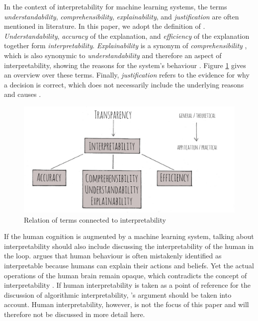 In the context of interpretability for machine learning systems, the terms \textit{understandability}, \textit{comprehensibility}, \textit{explainability}, and \textit{justification} are often mentioned in literature. In this paper, we adopt the definition of \cite{ruping2006learning}. \textit{Understandability}, \textit{accuracy} of the explanation, and \textit{efficiency} of the explanation together form \textit{interpretability}. \textit{Explainability} is a synonym of \textit{comprehensibility} \cite{weihs2003combining}, which is also synonymic to \textit{understandability} \cite{bibal2016interpretability} and therefore an aspect of interpretability, showing the reasons for the system's behaviour \cite{gilpin2018explaining}. Figure \ref{fig:definitions} gives an overview over these terms. Finally, \textit{justification} refers to the evidence for why a decision is correct, which does not necessarily include the underlying reasons and causes \cite{biran2017explanation}.\newline
\begin{figure} [h]
	\centering
	\includegraphics[width=0.7\linewidth]{img/definitions2}
	\caption{Relation of terms connected to interpretability}
	\label{fig:definitions}
\end{figure}
If the human cognition is augmented by a machine learning system, talking about interpretability should also include discussing the interpretability of the human in the loop. \cite{lipton2016mythos} argues that human behaviour is often mistakenly identified as interpretable because humans can explain their actions and beliefs. Yet the actual operations of the human brain remain opaque, which contradicts the concept of interpretability \cite{lipton2016mythos}. If human interpretability is taken as a point of reference for the discussion of algorithmic interpretability, \cite{lipton2016mythos}'s argument should be taken into account. Human interpretability, however, is not the focus of this paper and will therefore not be discussed in more detail here.\newline





